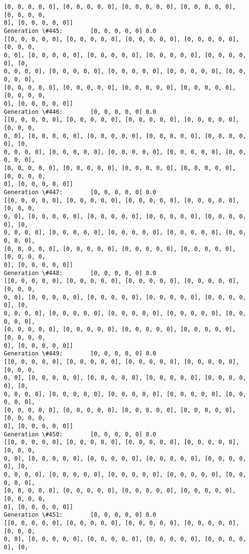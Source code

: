 \documentclass[11pt]{article}
\begin{document}
\begin{Verbatim}[commandchars=\\\{\}]
[0, 0, 0, 0, 0], [0, 0, 0, 0, 0], [0, 0, 0, 0, 0], [0, 0, 0, 0, 0], [0, 0, 0, 0,
0], [0, 0, 0, 0, 0]]
Generation \#445:        [0, 0, 0, 0, 0] 0.0
[[0, 0, 0, 0, 0], [0, 0, 0, 0, 0], [0, 0, 0, 0, 0], [0, 0, 0, 0, 0], [0, 0, 0,
0, 0], [0, 0, 0, 0, 0], [0, 0, 0, 0, 0], [0, 0, 0, 0, 0], [0, 0, 0, 0, 0], [0,
0, 0, 0, 0], [0, 0, 0, 0, 0], [0, 0, 0, 0, 0], [0, 0, 0, 0, 0], [0, 0, 0, 0, 0],
[0, 0, 0, 0, 0], [0, 0, 0, 0, 0], [0, 0, 0, 0, 0], [0, 0, 0, 0, 0], [0, 0, 0, 0,
0], [0, 0, 0, 0, 0]]
Generation \#446:        [0, 0, 0, 0, 0] 0.0
[[0, 0, 0, 0, 0], [0, 0, 0, 0, 0], [0, 0, 0, 0, 0], [0, 0, 0, 0, 0], [0, 0, 0,
0, 0], [0, 0, 0, 0, 0], [0, 0, 0, 0, 0], [0, 0, 0, 0, 0], [0, 0, 0, 0, 0], [0,
0, 0, 0, 0], [0, 0, 0, 0, 0], [0, 0, 0, 0, 0], [0, 0, 0, 0, 0], [0, 0, 0, 0, 0],
[0, 0, 0, 0, 0], [0, 0, 0, 0, 0], [0, 0, 0, 0, 0], [0, 0, 0, 0, 0], [0, 0, 0, 0,
0], [0, 0, 0, 0, 0]]
Generation \#447:        [0, 0, 0, 0, 0] 0.0
[[0, 0, 0, 0, 0], [0, 0, 0, 0, 0], [0, 0, 0, 0, 0], [0, 0, 0, 0, 0], [0, 0, 0,
0, 0], [0, 0, 0, 0, 0], [0, 0, 0, 0, 0], [0, 0, 0, 0, 0], [0, 0, 0, 0, 0], [0,
0, 0, 0, 0], [0, 0, 0, 0, 0], [0, 0, 0, 0, 0], [0, 0, 0, 0, 0], [0, 0, 0, 0, 0],
[0, 0, 0, 0, 0], [0, 0, 0, 0, 0], [0, 0, 0, 0, 0], [0, 0, 0, 0, 0], [0, 0, 0, 0,
0], [0, 0, 0, 0, 0]]
Generation \#448:        [0, 0, 0, 0, 0] 0.0
[[0, 0, 0, 0, 0], [0, 0, 0, 0, 0], [0, 0, 0, 0, 0], [0, 0, 0, 0, 0], [0, 0, 0,
0, 0], [0, 0, 0, 0, 0], [0, 0, 0, 0, 0], [0, 0, 0, 0, 0], [0, 0, 0, 0, 0], [0,
0, 0, 0, 0], [0, 0, 0, 0, 0], [0, 0, 0, 0, 0], [0, 0, 0, 0, 0], [0, 0, 0, 0, 0],
[0, 0, 0, 0, 0], [0, 0, 0, 0, 0], [0, 0, 0, 0, 0], [0, 0, 0, 0, 0], [0, 0, 0, 0,
0], [0, 0, 0, 0, 0]]
Generation \#449:        [0, 0, 0, 0, 0] 0.0
[[0, 0, 0, 0, 0], [0, 0, 0, 0, 0], [0, 0, 0, 0, 0], [0, 0, 0, 0, 0], [0, 0, 0,
0, 0], [0, 0, 0, 0, 0], [0, 0, 0, 0, 0], [0, 0, 0, 0, 0], [0, 0, 0, 0, 0], [0,
0, 0, 0, 0], [0, 0, 0, 0, 0], [0, 0, 0, 0, 0], [0, 0, 0, 0, 0], [0, 0, 0, 0, 0],
[0, 0, 0, 0, 0], [0, 0, 0, 0, 0], [0, 0, 0, 0, 0], [0, 0, 0, 0, 0], [0, 0, 0, 0,
0], [0, 0, 0, 0, 0]]
Generation \#450:        [0, 0, 0, 0, 0] 0.0
[[0, 0, 0, 0, 0], [0, 0, 0, 0, 0], [0, 0, 0, 0, 0], [0, 0, 0, 0, 0], [0, 0, 0,
0, 0], [0, 0, 0, 0, 0], [0, 0, 0, 0, 0], [0, 0, 0, 0, 0], [0, 0, 0, 0, 0], [0,
0, 0, 0, 0], [0, 0, 0, 0, 0], [0, 0, 0, 0, 0], [0, 0, 0, 0, 0], [0, 0, 0, 0, 0],
[0, 0, 0, 0, 0], [0, 0, 0, 0, 0], [0, 0, 0, 0, 0], [0, 0, 0, 0, 0], [0, 0, 0, 0,
0], [0, 0, 0, 0, 0]]
Generation \#451:        [0, 0, 0, 0, 0] 0.0
[[0, 0, 0, 0, 0], [0, 0, 0, 0, 0], [0, 0, 0, 0, 0], [0, 0, 0, 0, 0], [0, 0, 0,
0, 0], [0, 0, 0, 0, 0], [0, 0, 0, 0, 0], [0, 0, 0, 0, 0], [0, 0, 0, 0, 0], [0,

\end{Verbatim}
\end{document}
